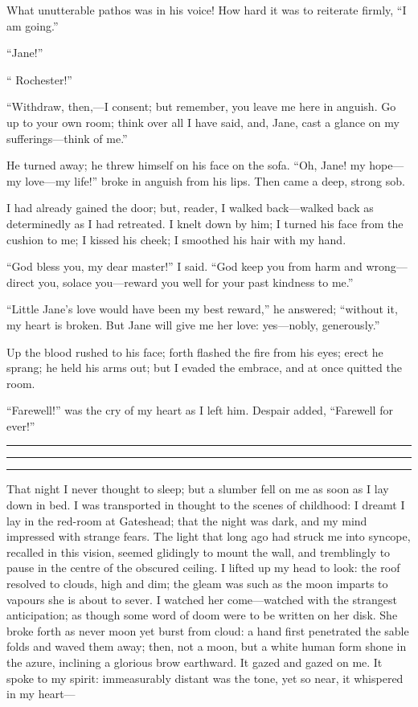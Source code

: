 What unutterable pathos was in his voice! How hard it was to reiterate
firmly, \enquote{I am going.}

\enquote{Jane!}

\enquote{\Mr{} Rochester!}

\enquote{Withdraw, then,---I consent; but remember, you leave me here in
anguish. Go up to your own room; think over all I have said, and, Jane,
cast a glance on my sufferings---think of me.}

He turned away; he threw himself on his face on the sofa. \enquote{Oh,
Jane! my hope---my love---my life!} broke in anguish from his lips. 
Then came a deep, strong sob.

I had already gained the door; but, reader, I walked back---walked back
as determinedly as I had retreated. I knelt down by him; I turned his
face from the cushion to me; I kissed his cheek; I smoothed his hair
with my hand.

\enquote{God bless you, my dear master!} I said. \enquote{God keep you
from harm and wrong---direct you, solace you---reward you well for your
past kindness to me.}

\enquote{Little Jane's love would have been my best reward,} he
answered; \enquote{without it, my heart is broken. But Jane will give
me her love: yes---nobly, generously.}

Up the blood rushed to his face; forth flashed the fire from his eyes;
erect he sprang; he held his arms out; but I evaded the embrace, and at
once quitted the room.

\enquote{Farewell!} was the cry of my heart as I left him. Despair
added, \enquote{Farewell for ever!}

\plainbreak{1}
\fancybreak{\texttt{[image: symbols/divider.pdf]}} %
\plainbreak{1}

That night I never thought to sleep; but a slumber fell on me as soon as
I lay down in bed. I was transported in thought to the scenes of
childhood: I dreamt I lay in the red-room at Gateshead; that the night
was dark, and my mind impressed with strange fears. The light that long
ago had struck me into syncope, recalled in this vision, seemed
glidingly to mount the wall, and tremblingly to pause in the centre of
the obscured ceiling. I lifted up my head to look: the roof resolved to
clouds, high and dim; the gleam was such as the moon imparts to vapours
she is about to sever. I watched her come---watched with the strangest
anticipation; as though some word of doom were to be written on her
disk. She broke forth as never moon yet burst from cloud: a hand first
penetrated the sable folds and waved them away; then, not a moon, but a
white human form shone in the azure, inclining a glorious brow
earthward. It gazed and gazed on me. It spoke to my spirit:
immeasurably distant was the tone, yet so near, it whispered in my
heart---

